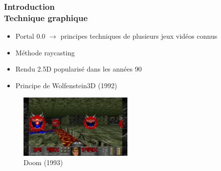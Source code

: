 \documentclass{beamer}
\begin{document}
\begin{frame}
    \frametitle{Introduction \\
                \small Technique graphique}
    \begin{block}{}
        \begin{itemize}
            \item Portal 0.0 $\rightarrow $ principes techniques de plusieurs jeux vidéos connus
        \end{itemize}
    \end{block}
    \begin{block}{}
        \begin{itemize}
            \item Méthode raycasting
            \item Rendu 2.5D popularisé dans les années 90
            \item Principe de Wolfenstein3D (1992)
        \end{itemize}
    \end{block}
    \begin{figure}
        \centering
        \includegraphics[width=0.5\textwidth]{images/doom_1993.jpg}
        \caption{Doom (1993)}
    \end{figure}
\end{frame}
\end{document}
